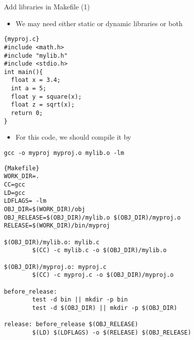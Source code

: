 \begin{frame}[fragile]{Add libraries in Makefile (1)}
\begin{itemize}
	\item {We may need either static or dynamic libraries or both}
\end{itemize}
\begin{lstlisting}[linewidth=0.9\linewidth, firstnumber=1, xleftmargin=0.05\linewidth]{myproj.c}
#include <math.h>
#include "mylib.h"
#include <stdio.h>
int main(){
  float x = 3.4;
  int a = 5;
  float y = square(x);
  float z = sqrt(x);
  return 0;
}
\end{lstlisting}
\begin{itemize}
	\item {For this code, we should compile it by}
\end{itemize}
\begin{lstlisting}[linewidth=0.9\linewidth, xleftmargin=0.05\linewidth]
gcc -o myproj myproj.o mylib.o -lm
\end{lstlisting}
\end{frame}

\begin{frame}[fragile]{}
\vspace{-0.1in}
\begin{lstlisting}[linewidth=0.95\linewidth, firstnumber= 1, xleftmargin=0.02\linewidth]{Makefile}
WORK_DIR=.
CC=gcc
LD=gcc
LDFLAGS= -lm
OBJ_DIR=$(WORK_DIR)/obj
OBJ_RELEASE=$(OBJ_DIR)/mylib.o $(OBJ_DIR)/myproj.o
RELEASE=$(WORK_DIR)/bin/myproj

$(OBJ_DIR)/mylib.o: mylib.c
        $(CC) -c mylib.c -o $(OBJ_DIR)/mylib.o

$(OBJ_DIR)/myproj.o: myproj.c
        $(CC) -c myproj.c -o $(OBJ_DIR)/myproj.o

before_release:
        test -d bin || mkdir -p bin
        test -d $(OBJ_DIR) || mkdir -p $(OBJ_DIR)

release: before_release $(OBJ_RELEASE)
        $(LD) $(LDFLAGS) -o $(RELEASE) $(OBJ_RELEASE)
\end{lstlisting}

\end{frame}
